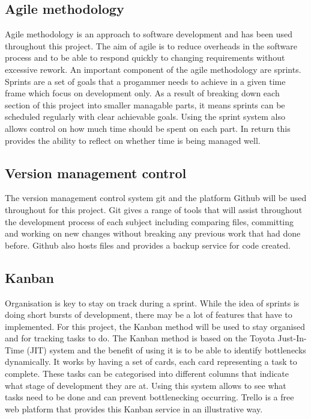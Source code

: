 \documentclass[a4paper,11pt]{report}
\begin{document}
\subsection{Agile methodology}
Agile methodology is an approach to software development and has been used throughout this project. The aim of agile is to reduce overheads in the software process and to be able to respond quickly to changing requirements without excessive rework. An important component of the agile methodology are sprints. Sprints are a set of goals that a progammer needs to achieve in a given time frame which focus on development only. As a result of breaking down each section of this project into smaller managable parts, it means sprints can be scheduled regularly with clear achievable goals. Using the sprint system also allows control on how much time should be spent on each part. In return this provides the ability to reflect on whether time is being managed well.

\subsection{Version management control}
The version management control system git and the platform Github will be used throughout for this project. Git gives a range of tools that will assist  throughout the development process of each subject including comparing files, committing and working on new changes without breaking any previous work that had done before. Github also hosts files and provides a backup service for code created.

\subsection{Kanban}
Organisation is key to stay on track during a sprint. While the idea of sprints is doing short bursts of development, there may be a lot of features that have to implemented. For this project, the Kanban method will be used to stay organised and for tracking tasks to do. The Kanban method is based on the Toyota Just-In-Time (JIT) system and the benefit of using it is to be able to identify bottlenecks dynamically. It works by having a set of cards, each card representing a task to complete. These tasks can be categorised into different columns that indicate what stage of development they are at. Using this system allows to see what tasks need to be done and can prevent bottlenecking occurring. Trello is a free web platform that provides this Kanban service in an illustrative way.
\end{document}
